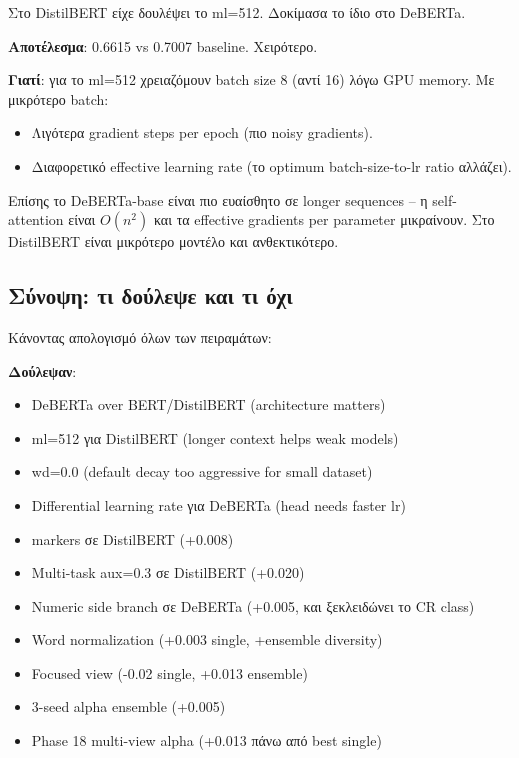 \documentclass[12pt]{fphw}
\begin{document}
Στο DistilBERT είχε δουλέψει το ml=512. Δοκίμασα το ίδιο στο DeBERTa.

\textbf{Αποτέλεσμα}: 0.6615 vs 0.7007 baseline. Χειρότερο.

\textbf{Γιατί}: για το ml=512 χρειαζόμουν batch size 8 (αντί 16) λόγω GPU memory. Με μικρότερο batch:
\begin{itemize}
    \item Λιγότερα gradient steps per epoch (πιο noisy gradients).
    \item Διαφορετικό effective learning rate (το optimum batch-size-to-lr ratio αλλάζει).
\end{itemize}

Επίσης το DeBERTa-base είναι πιο ευαίσθητο σε longer sequences -- η self-attention είναι $O(n^2)$ και τα effective gradients per parameter μικραίνουν. Στο DistilBERT είναι μικρότερο μοντέλο και ανθεκτικότερο.

\subsection{Σύνοψη: τι δούλεψε και τι όχι}

Κάνοντας απολογισμό όλων των πειραμάτων:

\textbf{Δούλεψαν}:
\begin{itemize}
    \item DeBERTa over BERT/DistilBERT (architecture matters)
    \item ml=512 για DistilBERT (longer context helps weak models)
    \item wd=0.0 (default decay too aggressive for small dataset)
    \item Differential learning rate για DeBERTa (head needs faster lr)
    \item [NEG] markers σε DistilBERT (+0.008)
    \item Multi-task aux=0.3 σε DistilBERT (+0.020)
    \item Numeric side branch σε DeBERTa (+0.005, και ξεκλειδώνει το CR class)
    \item Word normalization (+0.003 single, +ensemble diversity)
    \item Focused view (-0.02 single, +0.013 ensemble)
    \item 3-seed alpha ensemble (+0.005)
    \item Phase 18 multi-view alpha (+0.013 πάνω από best single)
\end{itemize}
\end{document}
